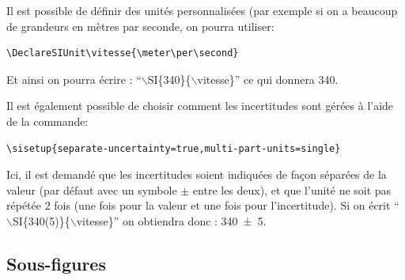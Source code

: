 Il est possible de définir des unités personnalisées (par exemple si on a beaucoup de grandeurs en mètres par seconde, on pourra utiliser:
{\small \begin{verbatim}
\DeclareSIUnit\vitesse{\meter\per\second}
\end{verbatim}}
\noindent Et ainsi on pourra écrire : ``$\backslash$SI\{340\}\{$\backslash$vitesse\}'' ce qui donnera \SI{340}{\vitesse}.\bigskip

Il est également possible de choisir comment les incertitudes sont gérées à l'aide de la commande:
{\small \begin{verbatim}
\sisetup{separate-uncertainty=true,multi-part-units=single} 
\end{verbatim}}
\noindent Ici, il est demandé que les incertitudes soient indiquées de façon séparées de la valeur (par défaut avec un symbole $\pm$ entre les deux), et que l'unité ne soit pas répétée 2 fois (une fois pour la valeur et une fois pour l'incertitude). Si on écrit ``$\backslash$SI\{340(5)\}\{$\backslash$vitesse\}'' on obtiendra donc : \SI{340(5)}{\vitesse}.

\subsection{Sous-figures}
\label{chap1:sec:exemple_subcaption}

